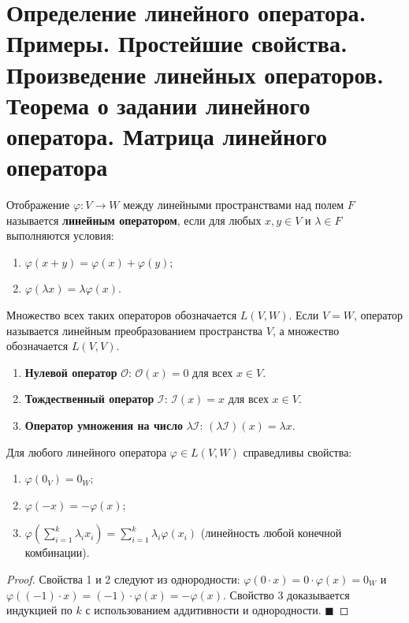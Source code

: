 \section{Определение линейного оператора. Примеры. Простейшие свойства. Произведение линейных операторов. Теорема о задании линейного оператора. Матрица линейного оператора}

\begin{definition}
Отображение $\varphi: V \to W$ между линейными пространствами над полем $F$ называется \textbf{линейным оператором}, если для любых $x, y \in V$ и $\lambda \in F$ выполняются условия:
\begin{enumerate}
    \item $\varphi(x + y) = \varphi(x) + \varphi(y)$;
    \item $\varphi(\lambda x) = \lambda \varphi(x)$.
\end{enumerate}
Множество всех таких операторов обозначается $L(V, W)$. Если $V = W$, оператор называется линейным преобразованием пространства $V$, а множество обозначается $L(V, V)$.
\end{definition}

\begin{example}
\begin{enumerate}
    \item \textbf{Нулевой оператор} $\mathcal{O}$: $\mathcal{O}(x) = 0$ для всех $x \in V$.
    \item \textbf{Тождественный оператор} $\mathcal{I}$: $\mathcal{I}(x) = x$ для всех $x \in V$.
    \item \textbf{Оператор умножения на число} $\lambda \mathcal{I}$: $(\lambda \mathcal{I})(x) = \lambda x$.
\end{enumerate}
\end{example}

\begin{theorem}
Для любого линейного оператора $\varphi \in L(V, W)$ справедливы свойства:
\begin{enumerate}
    \item $\varphi(0_V) = 0_W$;
    \item $\varphi(-x) = -\varphi(x)$;
    \item $\varphi\left(\sum_{i=1}^k \lambda_i x_i\right) = \sum_{i=1}^k \lambda_i \varphi(x_i)$ (линейность любой конечной комбинации).
\end{enumerate}
\end{theorem}

\begin{proof}
Свойства 1 и 2 следуют из однородности: $\varphi(0 \cdot x) = 0 \cdot \varphi(x) = 0_W$ и $\varphi((-1) \cdot x) = (-1) \cdot \varphi(x) = -\varphi(x)$. Свойство 3 доказывается индукцией по $k$ с использованием аддитивности и однородности.
\hfill$\blacksquare$
\end{proof}

